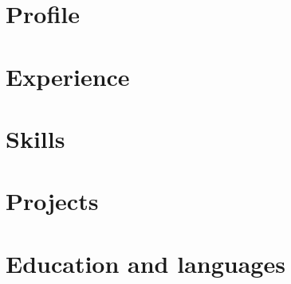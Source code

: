 \documentclass[a4paper,10pt]{article}
\begin{document}


\section*{Profile}


\section*{Experience}
\begin{cvexperience}


\end{cvexperience}

\section*{Skills}
\begin{cvcompact}


\end{cvcompact}

\section*{Projects}
\begin{cvblock}

\end{cvblock}

\section*{Education and languages}
\begin{cvcompact}


\end{cvcompact}
\end{document}
